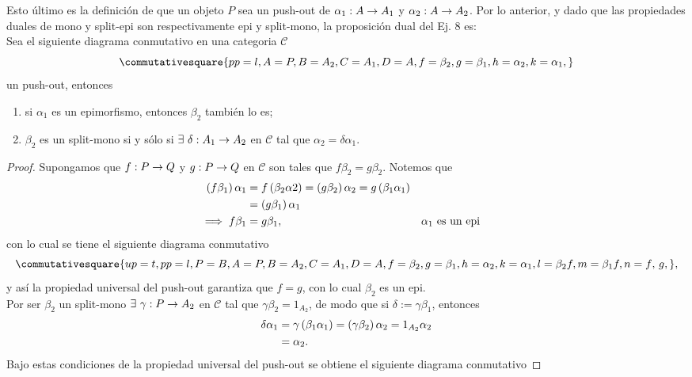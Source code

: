 \documentclass{article}
\begin{document}
\begin{enumerate}[label=\textbf{Ej \arabic*.}]
\begin{enumerate}[label=PB\textsuperscript{*}\Roman*)]
	\end{enumerate}
	Esto último es la definición de que un objeto $P$ sea un push-out de $\alpha_1:A\to A_1$ y $\alpha_2:A\to A_2$. Por lo anterior, y dado que las propiedades duales de mono y split-epi son respectivamente epi y split-mono, la proposición dual del Ej. 8 es:\\
	Sea el siguiente diagrama conmutativo en una categoria $\mathscr{C}$
	\begin{equation*}
		\commutativesquare{pp=l,A=P,B=A_2,C=A_1,D=A, f=\beta_2,g=\beta_1,h=\alpha_2,k=\alpha_1,}
	\end{equation*}	
	un push-out, entonces
		\begin{enumerate}
			\item si $\alpha_1$ es un epimorfismo, entonces $\beta_2$ también lo es;
			\item $\beta_2$ es un split-mono  si y sólo si $\exists\ \catarrow{\delta}{A_1}{A_2}$ en $\mathscr{C}$ tal que $\alpha_2=\delta\alpha_1$.
		\end{enumerate}
	\begin{proof}
		 Supongamos que $f:P\to Q$ y $g:P\to Q$ en $\mathscr{C}$ son tales que $f\beta_2=g\beta_2$. Notemos que
		\begin{align*}
			\left(f\beta_1\right)\alpha_1&=f\left(\beta_2\alpha 2\right)=\left(g\beta_2 \right)\alpha_2=g\left(\beta_1\alpha_1\right)\\
			&=\left(g\beta_1\right)\alpha_1\\
			\implies f\beta_1 &=g\beta_1 , && \alpha_1\text{ es un epi}
		\end{align*}
		con lo cual se tiene el siguiente diagrama conmutativo
		\begin{equation*}
			\commutativesquare{up=t,pp=l,P=B,A=P,B=A_2,C=A_1,D=A,f=\beta_2,g=\beta_1,h=\alpha_2,k=\alpha_1,l=\beta_2 f,m=\beta_1 f,n=f\text{, }g,},
		\end{equation*}
		y así la propiedad universal del push-out garantiza que $f=g$, con lo cual $\beta_2$ es un epi.\\
		 Por ser $\beta_2$ un split-mono $\exists\ \catarrow{\gamma}{P}{A_2}$ en $\mathscr{C}$ tal que $\gamma\beta_2=1_{A_2}$, de modo que si $\delta:=\gamma\beta_1$, entonces
		\begin{align*}
			\delta\alpha_1&=\gamma\left(\beta_1\alpha_1\right)=\left(\gamma\beta_2\right)\alpha_2=1_{A_2}\alpha_2\\
			&=\alpha_2. 
		\end{align*}
		 Bajo estas condiciones de la propiedad universal del push-out se obtiene el siguiente diagrama conmutativo

\end{proof}
\end{enumerate}
\end{document}

